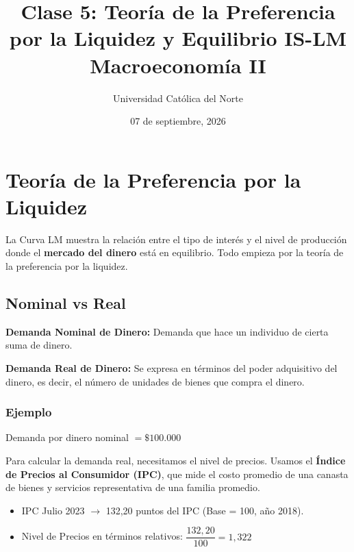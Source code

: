 \documentclass[11pt,a4paper]{article}
\title{\textbf{Clase 5: Teoría de la Preferencia por la Liquidez y Equilibrio IS-LM} \\ \large Macroeconomía II}
\author{Universidad Católica del Norte}
\date{07 de septiembre, 2026}
\begin{document}
\maketitle
\tableofcontents
\newpage

\section{Teoría de la Preferencia por la Liquidez}

\begin{definicionbox}[Curva LM]
La Curva LM muestra la relación entre el tipo de interés y el nivel de producción donde el \textbf{mercado del dinero} está en equilibrio. Todo empieza por la teoría de la preferencia por la liquidez.
\end{definicionbox}

\subsection{Nominal vs Real}

\begin{notabox}
\textbf{Demanda Nominal de Dinero:} Demanda que hace un individuo de cierta suma de dinero.

\textbf{Demanda Real de Dinero:} Se expresa en términos del poder adquisitivo del dinero, es decir, el número de unidades de bienes que compra el dinero.
\end{notabox}

\subsubsection{Ejemplo}

Demanda por dinero nominal $= \$100.000$

Para calcular la demanda real, necesitamos el nivel de precios. Usamos el \textbf{Índice de Precios al Consumidor (IPC)}, que mide el costo promedio de una canasta de bienes y servicios representativa de una familia promedio.

\begin{itemize}
    \item IPC Julio 2023 $\rightarrow$ 132,20 puntos del IPC (Base = 100, año 2018).
    \item Nivel de Precios en términos relativos: $\dfrac{132{,}20}{100} = 1{,}322$
\end{itemize}
\end{document}
